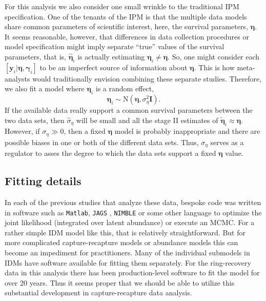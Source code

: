 \documentclass[12pt]{article}
\newcommand{\by}{\mathbf{y}}
\newcommand{\bn}{\boldsymbol{\eta}}
\newcommand{\bg}{\boldsymbol{\gamma}}
\newcommand{\tN}{\text{N}}
\newcommand{\bI}{\mathbf{I}}
\begin{document}
For this analysis we also consider one small wrinkle to the traditional IPM specification. One of the tenants of the IPM is that the multiple data models share common parameters of scientific interest, here, the survival parameters, $\bn$. It seems reasonable, however, that differences in data collection procedures or model specification might imply separate ``true'' values of the survival parameters, that is, $\hat{\bn}_i$ is actually estimating $\bn_i\ne\bn$. So, one might consider each $[\by_i|\bn,\bg_i]$ to be an imperfect source of information about $\bn$. This is how meta-analysts would traditionally envision combining these separate studies. Therefore, we also fit a model where $\bn_i$ is a random effect, 
\[
\bn_i \sim \tN(\bn, \sigma^2_\eta\bI).
\]
If the available data really support a common survival parameters between the two data sets, then $\hat{\sigma}_\eta$ will be small and all the stage II estimates of $\tilde{\bn}_i \approx \bn$. However, if $\sigma_\eta \gg 0$, then a fixed $\bn$ model is probably inappropriate and there are possible biases in one or both of the different data sets. Thus, $\sigma_\eta$ serves as a regulator to asses the degree to which the data sets support a fixed $\bn$ value.

\subsection{Fitting details}
 
In each of the previous studies that analyze these data, bespoke code was written in software such as {\tt Matlab}, {\tt JAGS} \citep{plummer2003jags}, {\tt NIMBLE} \citep{de2017programming} or some other language to optimize the joint likelihood (integrated over latent abundance) or execute an MCMC. For a rather simple IDM model like this, that is relatively straightforward. But for more complicated capture-recapture models or abundance  models this can become an impediment for practitioners. Many of the individual submodels in IDMs have software available for fitting them separately. For the ring-recovery data in this analysis there has been production-level software to fit the model for over 20 years. Thus it seems proper that we should be able to utilize this substantial development in capture-recapture data analysis. 
\end{document}
